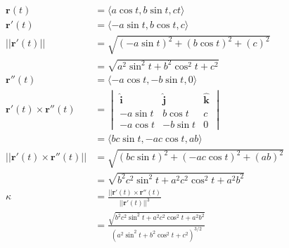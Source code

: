 \documentclass{article}
\begin{document}
\begin{align*}
  \mathbf{r}(t)                             & = \langle a \cos t, b \sin t, c t \rangle                                                                  \\
  \mathbf{r}'(t)                            & = \langle -a \sin t, b \cos t, c \rangle                                                                   \\
  ||\mathbf{r}'(t)||                        & = \sqrt{(-a \sin t)^2 + (b \cos t)^2 + (c)^2}                                                              \\
                                            & = \sqrt{a^2 \sin^2 t + b^2 \cos^2 t + c^2}                                                                 \\
  \mathbf{r}''(t)                           & = \langle -a \cos t, -b \sin t, 0 \rangle                                                                  \\
  \mathbf{r}'(t) \times \mathbf{r}''(t)     & = \begin{vmatrix}
                                                  \hat{\mathbf{i}} & \hat{\mathbf{j}} & \hat{\mathbf{k}} \\
                                                  -a \sin t        & b \cos t         & c                \\
                                                  -a \cos t        & -b \sin t        & 0
                                                \end{vmatrix}               \\
                                            & = \langle b c \sin t, -a c \cos t, a b \rangle                                                             \\
  ||\mathbf{r}'(t) \times \mathbf{r}''(t)|| & = \sqrt{(b c \sin t)^2 + (-a c \cos t)^2 + (a b)^2}                                                        \\
                                            & = \sqrt{b^2 c^2 \sin^2 t + a^2 c^2 \cos^2 t + a^2 b^2}                                                     \\
  \kappa                                    & = \frac{||\mathbf{r}'(t) \times \mathbf{r}''(t)}{||\mathbf{r}'(t)||^3}                                     \\
                                            & = \frac{\sqrt{b^2 c^2 \sin^2 t + a^2 c^2 \cos^2 t + a^2 b^2}}{(a^2 \sin^2 t + b^2 \cos^2 t + c^2)^{3 / 2}}
\end{align*}
\end{document}
